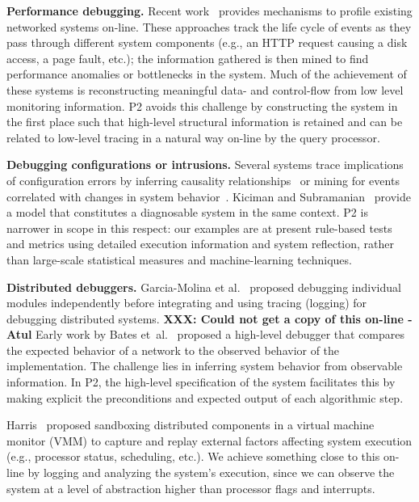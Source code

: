 \documentclass{sig-alt-full}
\def\Sys{P2\xspace}
\begin{document}
{\bf Performance debugging. }
Recent
work~\cite{blackbox-sosp03,magpie-osdi04,causeway-hotos05,chen-path-04} 
provides mechanisms to profile existing networked systems on-line.
These approaches track the life cycle of events
as they pass through different system components (e.g., an HTTP
request causing a disk access, a page fault, etc.); the
information  gathered is then mined to find performance anomalies or
bottlenecks in the system.  Much of the achievement of these systems is
reconstructing meaningful data- and control-flow from low level
monitoring information.  \Sys avoids this challenge by constructing
the system in the first place such that high-level structural
information is retained and can be related to low-level tracing in a
natural way on-line by the query processor.  

{\bf Debugging configurations or intrusions.}
Several systems trace implications of configuration
errors by inferring causality
relationships~\cite{mahajan-sigcomm02,wang-osdi04,King2003}
or 
mining for events correlated with changes in system
behavior~\cite{chronus-osdi04}. Kiciman and Subramanian~\cite{Kiciman_hotdep_2005} provide a
model that constitutes a diagnosable system in the
same context.  \Sys is narrower in scope in this respect: our
examples are at present rule-based tests and metrics using detailed
execution information and system reflection, rather than large-scale
statistical measures and machine-learning techniques.

{\bf Distributed debuggers.}
Garcia-Molina et al.~\cite{molina-tose} proposed debugging individual modules
independently before integrating and using tracing (logging) for debugging 
distributed systems. {\bf XXX: Could not get a copy of this on-line - Atul}
\fi
Early work by Bates et~al.~\cite{bates-83} proposed a high-level debugger
that compares the expected behavior of a network to the observed
behavior of the implementation.  The 
challenge lies in inferring system behavior from
observable information.  In \Sys, the high-level specification
of the system facilitates this by making explicit
the preconditions and expected output of each algorithmic step.

Harris~\cite{harris-EW02} proposed sandboxing
distributed components in a virtual machine monitor (VMM) to capture and
replay external factors affecting system execution
(e.g., processor status, scheduling, etc.).  We achieve something
close to this on-line by logging and analyzing the system's execution,
since we can observe the system at a level of abstraction
higher than processor flags and interrupts.
\end{document}
